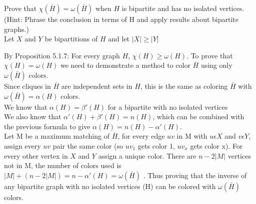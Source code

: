 \documentclass[12pt]{article}
\newenvironment{question}[2][Question]{\begin{trivlist}
\item[\hskip \labelsep {\bfseries #1}\hskip \labelsep {\bfseries #2.}]}{\end{trivlist}}
\begin{document}
\begin{question}{4}
Prove that $\chi(\bar{H}) = \omega(\bar{H})$ when $H$ is bipartite and has no isolated vertices. (Hint: Phrase the conclusion in terms of H and apply results about bipartite graphs.)\\

Let $X$ and $Y$ be bipartitions of $H$ and let $|X| \geq |Y| $

By Proposition 5.1.7: For every graph $H$, $\chi(H)\geq\omega(H)$. To prove that $\chi(H)= \omega(H)$ we need to demonstrate a method to color $\bar{H}$ using only $\omega(\bar{H})$ colors.\\

Since cliques in $\bar{H}$ are independent sets in $H$, this is the same as coloring $\bar{H}$ with $\omega(\bar{H}) =  \alpha(H)$ colors.\\ 

We know that $\alpha(H) = \beta'(H)$ for a bipartite with no isolated vertices\\

We also know that $\alpha'(H) + \beta'(H) = n(H)$, which can be combined with the previous formula to give $\alpha(H) = n(H)-\alpha'(H)$. \\

Let M be a maximum matching of $\bar{H}$, for every edge $uv$ in M with $u \epsilon X$ and $v \epsilon Y$, assign every $uv$ pair the same color (so ${uv}_1$ gets color 1, ${uv}_x$ gets color x). For every other vertex in $X$ and $Y$ assign a unique color. There are $n-2|M|$ vertices not in M, the number of colors used is $|M| + (n-2|M|) = n - \alpha'(H) = \omega(\bar{H})$ . Thus proving that the inverse of any bipartite graph with no isolated vertices (H) can be colored with $\omega(\bar{H})$ colors.

\end{question}
\end{document}
